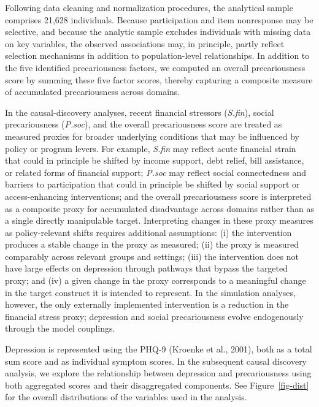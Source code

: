 \documentclass[
]{article}
\begin{document}
Following data cleaning and normalization procedures, the analytical
sample comprises 21,628 individuals.
\textcolor{BrickRed}{Because participation and item nonresponse may be selective, and because the analytic sample excludes individuals with missing data on key variables, the observed associations may, in principle, partly reflect selection mechanisms in addition to population-level relationships.}
In addition to the five identified precariousness factors, we computed
an overall precariousness score by summing these five factor scores,
thereby capturing a composite measure of accumulated precariousness
across domains.

\textcolor{BrickRed}{In the causal-discovery analyses, recent financial stressors (\textit{S.fin}), social precariousness (\textit{P.soc}), and the overall precariousness score are treated as measured proxies for broader underlying conditions that may be influenced by policy or program levers. For example, \textit{S.fin} may reflect acute financial strain that could in principle be shifted by income support, debt relief, bill assistance, or related forms of financial support; \textit{P.soc} may reflect social connectedness and barriers to participation that could in principle be shifted by social support or access-enhancing interventions; and the overall precariousness score is interpreted as a composite proxy for accumulated disadvantage across domains rather than as a single directly manipulable target. Interpreting changes in these proxy measures as policy-relevant shifts requires additional assumptions: (i) the intervention produces a stable change in the proxy as measured; (ii) the proxy is measured comparably across relevant groups and settings; (iii) the intervention does not have large effects on depression through pathways that bypass the targeted proxy; and (iv) a given change in the proxy corresponds to a meaningful change in the target construct it is intended to represent. In the simulation analyses, however, the only externally implemented intervention is a reduction in the financial stress proxy; depression and social precariousness evolve endogenously through the model couplings.}

Depression is represented using the PHQ-9 (Kroenke et al., 2001), both
as a total sum score and as individual symptom scores. In the subsequent
causal discovery analysis, we explore the relationship between
depression and precariousness using both aggregated scores and their
disaggregated components. See Figure~\ref{fig-dist} for the overall
distributions of the variables used in the analysis.
\end{document}

